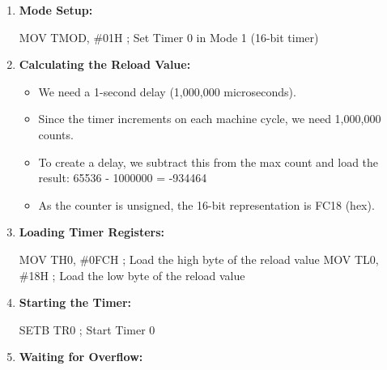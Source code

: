 \documentclass[
]{article}
\newenvironment{Shaded}{}{}
\newcommand{\NormalTok}[1]{#1}
\begin{document}
\begin{enumerate}
\def\labelenumi{\arabic{enumi}.}
\item
  \textbf{Mode Setup:}

\begin{Shaded}
\begin{Highlighting}[]
\NormalTok{MOV TMOD, \#01H ; Set Timer 0 in Mode 1 (16{-}bit timer)}
\end{Highlighting}
\end{Shaded}
\item
  \textbf{Calculating the Reload Value:}

  \begin{itemize}
  \item
    We need a 1-second delay (1,000,000 microseconds).
  \item
    Since the timer increments on each machine cycle, we need 1,000,000
    counts.
  \item
    To create a delay, we subtract this from the max count and load the
    result: 65536 - 1000000 = -934464
  \item
    As the counter is unsigned, the 16-bit representation is FC18 (hex).
  \end{itemize}
\item
  \textbf{Loading Timer Registers:}

\begin{Shaded}
\begin{Highlighting}[]
\NormalTok{MOV TH0, \#0FCH ; Load the high byte of the reload value}
\NormalTok{MOV TL0, \#18H  ; Load the low byte of the reload value}
\end{Highlighting}
\end{Shaded}
\item
  \textbf{Starting the Timer:}

\begin{Shaded}
\begin{Highlighting}[]
\NormalTok{SETB TR0 ; Start Timer 0}
\end{Highlighting}
\end{Shaded}
\item
  \textbf{Waiting for Overflow:}

\begin{Shaded}
\end{Shaded}
\end{enumerate}
\end{document}
